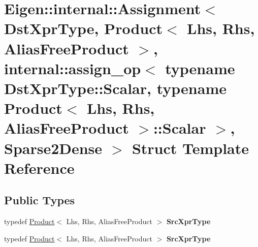 \hypertarget{struct_eigen_1_1internal_1_1_assignment_3_01_dst_xpr_type_00_01_product_3_01_lhs_00_01_rhs_00_01c841c32521f12d3d43fe6d566cc4cbd8}{}\section{Eigen\+:\+:internal\+:\+:Assignment$<$ Dst\+Xpr\+Type, Product$<$ Lhs, Rhs, Alias\+Free\+Product $>$, internal\+:\+:assign\+\_\+op$<$ typename Dst\+Xpr\+Type\+:\+:Scalar, typename Product$<$ Lhs, Rhs, Alias\+Free\+Product $>$\+:\+:Scalar $>$, Sparse2\+Dense $>$ Struct Template Reference}
\label{struct_eigen_1_1internal_1_1_assignment_3_01_dst_xpr_type_00_01_product_3_01_lhs_00_01_rhs_00_01c841c32521f12d3d43fe6d566cc4cbd8}
\subsection*{Public Types}
\begin{DoxyCompactItemize}
\item 
\mbox{\label{struct_eigen_1_1internal_1_1_assignment_3_01_dst_xpr_type_00_01_product_3_01_lhs_00_01_rhs_00_01c841c32521f12d3d43fe6d566cc4cbd8_abddf37655aa7ad93f556b77e97a36ab2}} 
typedef \hyperlink{group___core___module_class_eigen_1_1_product}{Product}$<$ Lhs, Rhs, Alias\+Free\+Product $>$ {\bfseries Src\+Xpr\+Type}
\item 
\mbox{\label{struct_eigen_1_1internal_1_1_assignment_3_01_dst_xpr_type_00_01_product_3_01_lhs_00_01_rhs_00_01c841c32521f12d3d43fe6d566cc4cbd8_abddf37655aa7ad93f556b77e97a36ab2}} 
typedef \hyperlink{group___core___module_class_eigen_1_1_product}{Product}$<$ Lhs, Rhs, Alias\+Free\+Product $>$ {\bfseries Src\+Xpr\+Type}
\end{DoxyCompactItemize}
